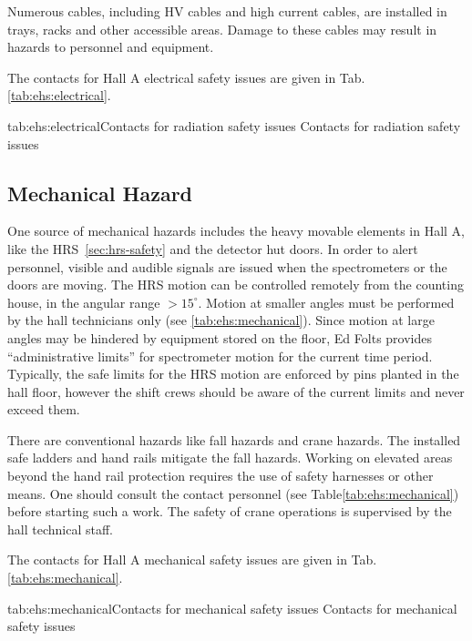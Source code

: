  Numerous cables, including HV cables and high current cables, are installed in trays, 
 racks and other accessible areas. Damage to these cables may result
 in hazards to personnel and equipment. 

 The contacts for Hall A electrical safety issues are given in Tab.\ref{tab:ehs:electrical}.
 
 \begin{namestab}{tab:ehs:electrical}{Contacts for radiation safety issues}{%
   Contacts for radiation safety issues}
  \MarkStevens{}
 \end{namestab}

 
\begin{safetyen}{0}{0}
\section{Mechanical Hazard} 
\label{sec:mechhazard}
\end{safetyen}

 One source of mechanical hazards includes the heavy movable 
 elements in Hall A, like the HRS~\ref{sec:hrs-safety} and the detector hut doors.
 In order to alert personnel, visible and audible signals are issued when
 the spectrometers or the doors are moving.   
 The HRS motion can be controlled remotely from the counting house,
 in the angular range $>15^\circ$. Motion at smaller angles
 must be performed by the hall technicians only (see \ref{tab:ehs:mechanical}).
 Since motion at large angles may be hindered by equipment stored on the floor,
 Ed Folts provides ``administrative limits'' for spectrometer motion for
 the current time period. Typically, the safe limits for the HRS motion 
 are enforced by pins planted in the hall floor, however the shift crews should
 be aware of the current limits and never exceed them.

 There are conventional
 hazards like fall hazards and crane hazards. The installed safe ladders and hand rails
 mitigate the fall hazards. Working on elevated areas beyond the hand rail protection
 requires the use of safety harnesses or other means. One should consult the contact
 personnel (see Table\ref{tab:ehs:mechanical}) before starting such a work.
 The safety of crane operations is supervised by the hall technical staff. 

 The contacts for Hall A mechanical safety issues are given in Tab.\ref{tab:ehs:mechanical}.
 
 \begin{namestab}{tab:ehs:mechanical}{Contacts for mechanical safety issues}{%
   Contacts for mechanical safety issues}
  \MarkStevens{}
 \end{namestab}

